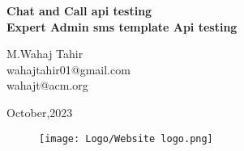 \begin{Titlepage}
\begin{center}
    \vspace*{2cm}
    
    \textbf{\Huge Chat and Call api testing
\\Expert Admin sms template Api testing }\\
    \vspace*{2cm}
    
      
      \vspace{0.2cm}
      \begin{center}
          \large M.Wahaj Tahir\\wahajtahir01@gmail.com\\wahajt@acm.org
      \end{center} 
    
    \vspace{1.5cm}
    \begin{center}
    \large October,2023 
    \end{center}
    
    \vfill
    \vspace{0.8cm}
    \begin{figure}[hb]
        \centering
        \texttt{[image: Logo/Website logo.png]}
    \end{figure}
    \end{center}
\end{Titlepage}








